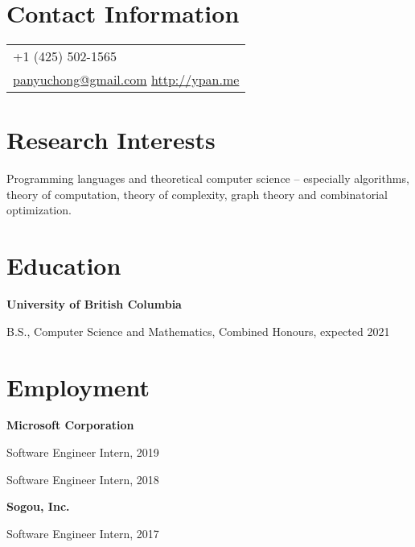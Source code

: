 \documentclass[margin,line]{res}
\newenvironment{list1}{
  \begin{list}{\ding{113}}{%
      \setlength{\itemsep}{0in}
      \setlength{\parsep}{0in} \setlength{\parskip}{0in}
      \setlength{\topsep}{0in} \setlength{\partopsep}{0in}
      \setlength{\leftmargin}{0.17in}}}{\end{list}}
\begin{document}

\begin{resume}

\section{\sc Contact Information}

\vspace{.05in}
\begin{tabular}{p{2in}}
+1 (425) 502-1565 \\
\href{mailto:panyuchong@gmail.com}{panyuchong@gmail.com}
\href{http://ypan.me/}{http://ypan.me}
\end{tabular}


\section{\sc Research Interests}
Programming languages and theoretical computer science -- especially algorithms, theory of computation, theory of complexity, graph theory and combinatorial optimization.

\section{\sc Education}

{\bf University of British Columbia}\\
\vspace*{-.1in}
\begin{list1}
\item[] B.S., Computer Science and Mathematics, Combined Honours, expected 2021
\end{list1}


\section{\sc Employment}

{\bf Microsoft Corporation}\\
\vspace*{-.1in}
\begin{list1}
\item[] Software Engineer Intern, 2019
\item[] Software Engineer Intern, 2018
\end{list1}

{\bf Sogou, Inc.}\\
\vspace*{-.1in}
\begin{list1}
\item[] Software Engineer Intern, 2017
\end{list1}


\end{resume}
\end{document}
